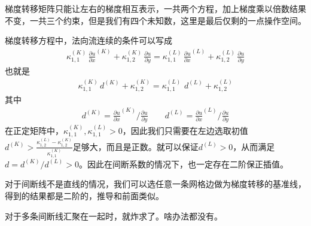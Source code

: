 \documentclass[12pt,a4paper]{article}
\theoremstyle{definition}
\begin{document}
梯度转移矩阵只能让左右的梯度相互表示，一共两个方程，加上梯度乘以倍数结果不变，一共三个约束，但是我们有四个未知数，这里是最后仅剩的一点操作空间。

梯度转移方程中，法向流连续的条件可以写成
\begin{align*}
\kappa^{(K)}_{1,1} \, \frac{\partial u}{\partial x}^{(K)} + \kappa^{(K)}_{1,2} \, \frac{\partial u}{\partial y} = \kappa^{(L)}_{1,1} \, \frac{\partial u}{\partial x}^{(L)} + \kappa^{(L)}_{1,2} \, \frac{\partial u}{\partial y}
\end{align*}
也就是
\begin{align*}
\kappa^{(K)}_{1,1} \, d^{(K)} + \kappa^{(K)}_{1,2} = \kappa^{(L)}_{1,1} \,  \, d^{(L)} + \kappa^{(L)}_{1,2}
\end{align*}
其中
\begin{align*}
d^{(K)} = \frac{\partial u}{\partial x}^{(K)} / \frac{\partial u}{\partial y} \qquad d^{(L)} = \frac{\partial u}{\partial x}^{(L)} / \frac{\partial u}{\partial y}
\end{align*}
在正定矩阵中，$\kappa^{(K)}_{1,1}, \kappa^{(L)}_{1,1} > 0$，因此我们只需要在左边选取初值$d^{(K)} > \frac{\kappa^{(L)}_{1,2} - \kappa^{(K)}_{1,2}}{\kappa^{(K)}_{1,1}}$足够大，而且是正数。就可以保证$d^{(L)} > 0$，从而满足$d = d^{(K)} / d^{(L)} > 0$。因此在间断系数的情况下，也一定存在二阶保正插值。

对于间断线不是直线的情况，我们可以选任意一条网格边做为梯度转移的基准线，得到的结果都是二阶的，推导和前面类似。

对于多条间断线汇聚在一起时，就炸求了。啥办法都没有。



\end{document}
